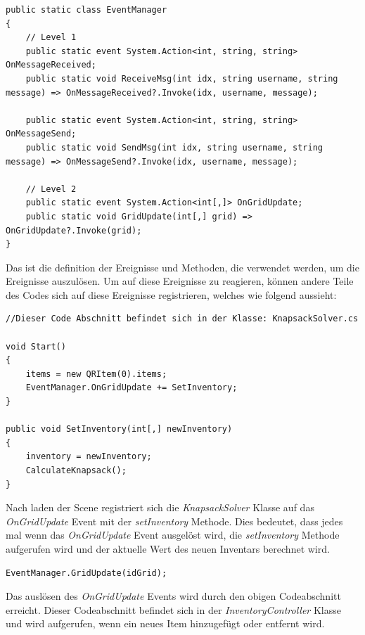 \begin{lstlisting}[style=csharp, label=code:EventManager]
public static class EventManager
{
    // Level 1
    public static event System.Action<int, string, string> OnMessageReceived;
    public static void ReceiveMsg(int idx, string username, string message) => OnMessageReceived?.Invoke(idx, username, message);

    public static event System.Action<int, string, string> OnMessageSend;
    public static void SendMsg(int idx, string username, string message) => OnMessageSend?.Invoke(idx, username, message);

    // Level 2
    public static event System.Action<int[,]> OnGridUpdate;
    public static void GridUpdate(int[,] grid) => OnGridUpdate?.Invoke(grid);
}
\end{lstlisting}

Das ist die definition der Ereignisse und Methoden, die verwendet werden, um die Ereignisse auszulösen.
Um auf diese Ereignisse zu reagieren, können andere Teile des Codes sich auf diese Ereignisse registrieren, welches wie folgend
aussieht:

\begin{lstlisting}[style=csharp label=code:Event Registration]
//Dieser Code Abschnitt befindet sich in der Klasse: KnapsackSolver.cs

void Start()
{
    items = new QRItem(0).items;
    EventManager.OnGridUpdate += SetInventory;
}

public void SetInventory(int[,] newInventory)
{
    inventory = newInventory;
    CalculateKnapsack();
}
\end{lstlisting}

Nach laden der Scene registriert sich die \textit{KnapsackSolver} Klasse auf das \textit{OnGridUpdate} Event mit
der \textit{setInventory} Methode. Dies bedeutet, dass jedes mal wenn das \textit{OnGridUpdate} Event ausgelöst wird,
die \textit{setInventory} Methode aufgerufen wird und der aktuelle Wert des neuen Inventars berechnet wird.

\begin{lstlisting}[style=csharp label=code:Event Trigger]
EventManager.GridUpdate(idGrid);
\end{lstlisting}

Das auslösen des \textit{OnGridUpdate} Events wird durch den obigen Codeabschnitt erreicht. Dieser Codeabschnitt befindet
sich in der \textit{InventoryController} Klasse und wird aufgerufen, wenn ein neues Item hinzugefügt oder entfernt wird.


